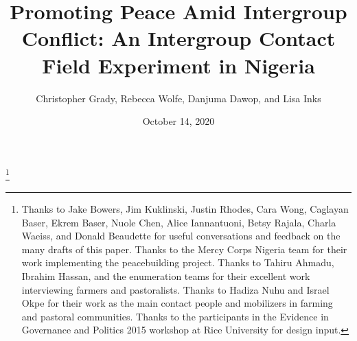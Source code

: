 \documentclass[11pt]{article}
\title{Promoting Peace Amid Intergroup Conflict: An Intergroup Contact
Field Experiment in Nigeria}
\author{\parbox{.7\linewidth}{\centering
Christopher Grady, Rebecca Wolfe, Danjuma Dawop, and Lisa Inks
}
}
\date{October 14, 2020}
\begin{document}
\VerbatimFootnotes

%
%
%
%
%
%
%
%
%
%

\newlength{\cslhangindent}
\setlength{\cslhangindent}{1.5em}
\newenvironment{cslreferences}%
  {\setlength{\parindent}{0pt}%
  \everypar{\setlength{\hangindent}{\cslhangindent}}\ignorespaces}%
  {\par}

\maketitle


\newcommand\blfootnote[1]{%
  \begingroup
  \renewcommand\thefootnote{}\footnote{#1}%
  \addtocounter{footnote}{-1}%
  \endgroup
}
\singlespacing\blfootnote{Thanks to Jake Bowers, Jim Kuklinski, Justin
Rhodes, Cara Wong, Caglayan Baser, Ekrem Baser, Nuole Chen, Alice
Iannantuoni, Betsy Rajala, Charla Waeiss, and Donald Beaudette for
useful conversations and feedback on the many drafts of this paper.
Thanks to the Mercy Corps Nigeria team for their work implementing the
peacebuilding project. Thanks to Tahiru Ahmadu, Ibrahim Hassan, and the
enumeration teams for their excellent work interviewing farmers and
pastoralists. Thanks to Hadiza Nuhu and Israel Okpe for their work as
the main contact people and mobilizers in farming and pastoral
communities. Thanks to the participants in the Evidence in Governance
and Politics 2015 workshop at Rice University for design input.}
\end{document}
